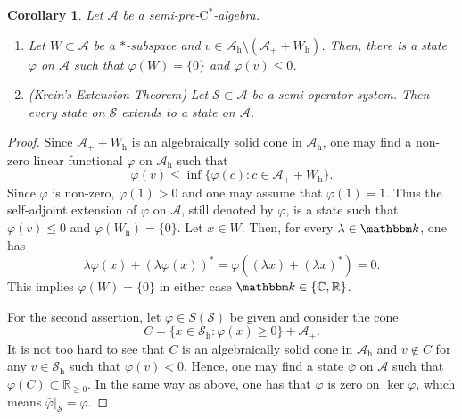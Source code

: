 \documentclass[12pt]{amsart}
\newtheorem{cor}[thm]{Corollary}
\theoremstyle{definition}
\begin{document}
\begin{cor}\label{cor:hb}
Let ${{\mathcal A}}$ be a {semi-pre-$\mathrm{C}^*$-alge\-bra\xspace}.
\begin{enumerate}[$\bullet$]
\item
Let $W\subset{{\mathcal A}}$ be a $*$-subspace
and $v\in{{\mathcal A}}_{\mathrm{h}}\setminus ({{\mathcal A}}_+ + W_{\mathrm{h}})$.
Then, there is a state ${\varphi}$ on ${{\mathcal A}}$ such that ${\varphi}(W)=\{0\}$ and ${\varphi}(v)\le0$.
\item {\normalfont (Krein's Extension Theorem)}
Let ${{\mathcal S}}\subset{{\mathcal A}}$ be a semi-operator system.
Then every state on ${{\mathcal S}}$ extends to a state on ${{\mathcal A}}$.
\end{enumerate}
\end{cor}
\begin{proof}
Since ${{\mathcal A}}_+ + W_{\mathrm{h}}$ is an algebraically solid cone in ${{\mathcal A}}_{\mathrm{h}}$, one may find
a non-zero linear functional ${\varphi}$ on ${{\mathcal A}}_{\mathrm{h}}$ such that
\[
{\varphi}(v)\le\inf\{{\varphi}(c) : c\in{{\mathcal A}}_+ + W_{\mathrm{h}}\}.
\]
Since ${\varphi}$ is non-zero, ${\varphi}(1)>0$ and one may assume that ${\varphi}(1)=1$.
Thus the self-adjoint extension of ${\varphi}$ on ${{\mathcal A}}$, still denoted by ${\varphi}$,
is a state such that ${\varphi}(v)\le0$ and ${\varphi}(W_{\mathrm{h}})=\{0\}$.
Let $x\in W$. Then, for every $\lambda\in{{\mathbbm k}}$, one has
\[
\lambda {\varphi}(x) + (\lambda{\varphi}(x))^* = {\varphi}((\lambda x)+(\lambda x)^*)=0.
\]
This implies ${\varphi}(W)=\{0\}$ in either case ${{\mathbbm k}}\in\{{{\mathbb C}},{{\mathbb R}}\}$.

For the second assertion, let ${\varphi}\in S({{\mathcal S}})$ be given and consider the cone
\[
C=\{ x\in {{\mathcal S}}_{\mathrm{h}} : {\varphi}(x)\geq0\}+{{\mathcal A}}_+.
\]
It is not too hard to see that $C$ is an algebraically solid cone in ${{\mathcal A}}_{\mathrm{h}}$
and $v\notin C$ for any $v\in {{\mathcal S}}_{\mathrm{h}}$ such that ${\varphi}(v)<0$.
Hence, one may find a state $\bar{\varphi}$ on ${{\mathcal A}}$
such that $\bar{\varphi}(C)\subset{{\mathbb R}}_{\geq0}$.
In the same way as above, one has that $\bar{\varphi}$ is zero on $\ker{\varphi}$,
which means $\bar{\varphi}|_{{\mathcal S}}={\varphi}$.
\end{proof}
\end{document}
